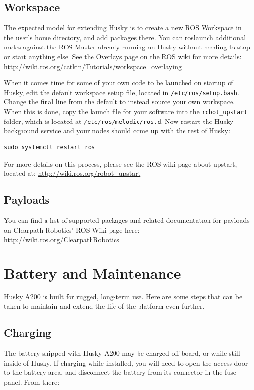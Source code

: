 \documentclass[]{clearpath-latex/clearpath-manual}
\begin{document}
\subsection{Workspace}
The expected model for extending Husky is to create a new ROS Workspace in the user’s home directory,
and add packages there. You can roslaunch additional nodes against the ROS Master already running on Husky
without needing to stop or start anything else. See the Overlays page on the ROS wiki for more details:
\url{http://wiki.ros.org/catkin/Tutorials/workspace_overlaying}

When it comes time for some of your own code to be launched on startup of Husky, edit the default workspace setup file,
located in \lstinline{/etc/ros/setup.bash}. Change the final line from the default to instead source your own workspace.
When this is done, copy the launch file for your software into the \lstinline{robot_upstart} folder, which is located at
\lstinline{/etc/ros/melodic/ros.d}. Now restart the Husky background service and your nodes should come
up with the rest of Husky:

\begin{lstlisting}
sudo systemctl restart ros
\end{lstlisting}

For more details on this process, please see the ROS wiki page about upstart, located at: \url{http://wiki.ros.org/robot_upstart}

\subsection{Payloads}
You can find a list of supported packages and related documentation for payloads on Clearpath Robotics’
ROS Wiki page here: \url{http://wiki.ros.org/ClearpathRobotics}
\newpage

\section{Battery and Maintenance}
Husky A200 is built for rugged, long-term use. Here are some steps that can be
taken to maintain and extend the life of the platform even further.

\subsection{Charging}
The battery shipped with Husky A200 may be charged off-board, or while still inside of Husky.
If charging while installed, you will need to open the access door to the battery area, and
disconnect the battery from its connector in the fuse panel. From there:
\end{document}
